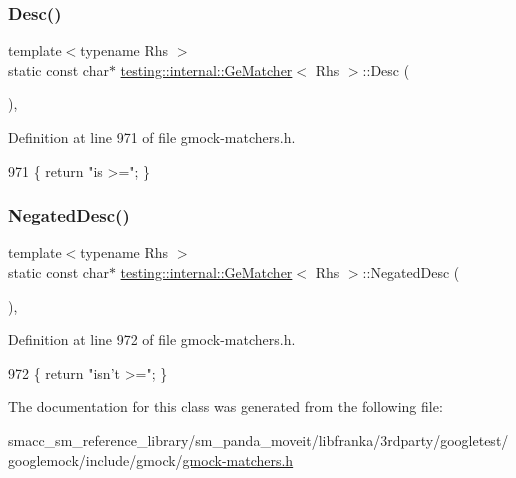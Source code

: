 \subsubsection{\texorpdfstring{Desc()}{Desc()}}
{\footnotesize\ttfamily template$<$typename Rhs $>$ \\
static const char$\ast$ \hyperlink{classtesting_1_1internal_1_1GeMatcher}{testing\+::internal\+::\+Ge\+Matcher}$<$ Rhs $>$\+::Desc (\begin{DoxyParamCaption}{ }\end{DoxyParamCaption})\hspace{0.3cm}{\ttfamily [inline]}, {\ttfamily [static]}}



Definition at line 971 of file gmock-\/matchers.\+h.


\begin{DoxyCode}
971 \{ \textcolor{keywordflow}{return} \textcolor{stringliteral}{"is >="}; \}
\end{DoxyCode}
\mbox{\label{classtesting_1_1internal_1_1GeMatcher_a028847a76dbf02b8da3d56ce448ef053}} 
\subsubsection{\texorpdfstring{Negated\+Desc()}{NegatedDesc()}}
{\footnotesize\ttfamily template$<$typename Rhs $>$ \\
static const char$\ast$ \hyperlink{classtesting_1_1internal_1_1GeMatcher}{testing\+::internal\+::\+Ge\+Matcher}$<$ Rhs $>$\+::Negated\+Desc (\begin{DoxyParamCaption}{ }\end{DoxyParamCaption})\hspace{0.3cm}{\ttfamily [inline]}, {\ttfamily [static]}}



Definition at line 972 of file gmock-\/matchers.\+h.


\begin{DoxyCode}
972 \{ \textcolor{keywordflow}{return} \textcolor{stringliteral}{"isn't >="}; \}
\end{DoxyCode}


The documentation for this class was generated from the following file\+:\begin{DoxyCompactItemize}
\item 
smacc\+\_\+sm\+\_\+reference\+\_\+library/sm\+\_\+panda\+\_\+moveit/libfranka/3rdparty/googletest/googlemock/include/gmock/\hyperlink{gmock-matchers_8h}{gmock-\/matchers.\+h}\end{DoxyCompactItemize}
